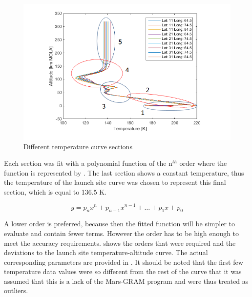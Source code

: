 \begin{figure}[!ht]
\centering
\includegraphics[width=1.0\textwidth]{figures/software/temperatureDataSplit5.png}
\caption{Different temperature curve sections}
\label{fig:temperatureDataSplit5}
\end{figure}

Each section was fit with a polynomial function of the n$^{th}$ order where the function is represented by . The last section shows a constant temperature, thus the temperature of the launch site curve was chosen to represent this final section, which is equal to 136.5 K.

\begin{equation} \label{eq:polyGenFunct}
y=p_{n}x^{n}+p_{n-1}x^{n-1}+\dots+p_{1}x+p_{0}
\end{equation}

A lower order is preferred, because then the fitted function will be simpler to evaluate and contain fewer terms. However the order has to be high enough to meet the accuracy requirements.  shows the orders that were required and the deviations to the launch site temperature-altitude curve. The actual corresponding parameters are provided in . It should be noted that the first few temperature data values were so different from the rest of the curve that it was assumed that this is a lack of the Mars-\ac{GRAM} program and were thus treated as outliers.

